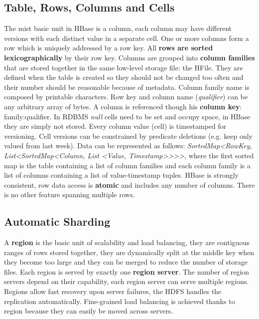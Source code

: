 	\subsection{Table, Rows, Columns and Cells}
	The mist basic unit in HBase is a column, each column may have different versions with each distinct value in a separate cell. One or more columns form a row which is uniquely addressed by a row key. All\textbf{ rows are sorted lexicographically} by their row key.\newline
	\newline
	Columns are grouped into \textbf{column families} that are stored together in the same low-level storage file: the HFile. They are defined when the table is created so they should not be changed too often and their number should be reasonable because of metadata.\newline
	Column family name is composed by printable characters. Row key and column name (\textit{qualifier}) can be any arbitrary array of bytes.\newline
	A column is referenced though his \textbf{column key}: family:qualifier.\newline
	\newline
	In RDBMS \textit{null} cells need to be set and occupy space, in HBase they are simply not stored.\newline
	Every column value (cell) is timestamped for versioning. Cell versions can be constrained by predicate deletions (e.g. keep only valued from last week).\newline
	\newline
	Data can be represented as follows: \textit{SortedMap<RowKey, List<SortedMap<Column, List <Value, Timestamp>>>>}, where the first sorted map is the table containing a list of column families and each column family is a list of columns containing a list of value-timestamp tuples.\newline
	\newline
	HBase is strongly consistent, row data access is \textbf{atomic} and includes any number of columns. There is no other feature spanning multiple rows.
	\subsection{Automatic Sharding}
	A \textbf{region} is the basic unit of scalability and load balancing, they are contiguous ranges of rows stored together, they are dynamically split at the middle key when they become too large and they can be merged to reduce the number of storage files.\newline
	Each region is served by exactly one \textbf{region server}. The number of region servers depend on their capability, each region server can serve multiple regions.\newline
	Regions allow fast recovery upon server failures, the HDFS handles the replication automatically.\newline
	Fine-grained load balancing is achieved thanks to region because they can easily be moved across servers.
